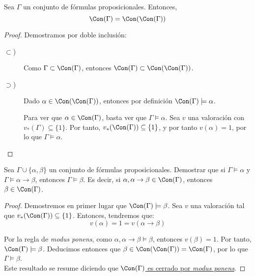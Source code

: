 \begin{prop}
    Sea $\Gamma$ un conjunto de fórmulas proposicionales. Entonces,
    \begin{equation*}
        \Con(\Gamma)=\Con(\Con(\Gamma))
    \end{equation*}
    \begin{proof}
        Demostramos por doble inclusión:
        \begin{description}
            \item[$\subset$)] Como $\Gamma\subset \Con(\Gamma)$, entonces $\Con(\Gamma)\subset \Con(\Con(\Gamma))$.
            
            \item[$\supset$)] Dado $\alpha\in \Con(\Con(\Gamma))$, entonces por definición $\Con(\Gamma)\models\alpha$.
            
            Para ver que $\alpha\in \Con(\Gamma)$, basta ver que $\Gamma\models\alpha$. Sea $v$ una valoración con $v_\ast(\Gamma)\subseteq \{1\}$.
            Por tanto, $v_\ast(\Con(\Gamma))\subseteq \{1\}$, y por tanto $v(\alpha)=1$, por lo que $\Gamma\models\alpha$.
        \end{description}
    \end{proof}
\end{prop}


\begin{ejercicio}
    Sea $\Gamma \cup \{\alpha,\beta\}$ un conjunto de fórmulas proposicionales.
    Demostrar que si $\Gamma \models \alpha$ y $\Gamma \models \alpha\rightarrow \beta$, entonces $\Gamma \models \beta$.
    Es decir, si $\alpha,\alpha\to \beta \in \Con(\Gamma)$, entonces $\beta\in \Con(\Gamma)$.
    \begin{proof}
        Demostremos en primer lugar que $\Con(\Gamma)\models \beta$.
        Sea $v$ una valoración tal que $v_\ast(\Con(\Gamma))\subseteq \{1\}$. Entonces, tendremos que:
        \begin{equation*}
            v(\alpha)=1=v(\alpha\rightarrow\beta)
        \end{equation*}
        
        Por la regla de \emph{modus ponens}, como $\alpha,\alpha\rightarrow\beta\models \beta$, entonces $v(\beta)=1$.
        Por tanto, $\Con(\Gamma)\models \beta$.
        Deducimos entonces que $\beta \in \Con(\Con(\Gamma)) = \Con(\Gamma)$, por lo que $\Gamma \models \beta$.\\

        Este resultado se resume diciendo que \ul{$\Con(\Gamma)$ es cerrado por \emph{modus ponens}}.
    \end{proof}
\end{ejercicio}

